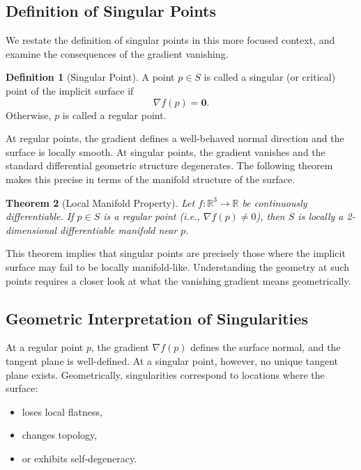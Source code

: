 \documentclass[12pt, a4paper, oneside]{book}
\theoremstyle{plain}
\newtheorem{theorem}{Theorem}[chapter]
\theoremstyle{definition}
\newtheorem{definition}[theorem]{Definition}
\theoremstyle{remark}
\theoremstyle{definition}
\begin{document}
\subsection{Definition of Singular Points}

We restate the definition of singular points in this more focused context, and examine the consequences of the gradient vanishing.

\begin{definition}[Singular Point]
A point $p \in S$ is called a singular (or critical) point of the implicit surface if
\[
\nabla f(p) = \mathbf{0}.
\]
Otherwise, $p$ is called a regular point.
\end{definition}

At regular points, the gradient defines a well-behaved normal direction and the surface
is locally smooth. At singular points, the gradient vanishes and the standard differential
geometric structure degenerates. The following theorem makes this precise in terms of the
manifold structure of the surface.

\begin{theorem}[Local Manifold Property]
Let $f:\mathbb{R}^3 \rightarrow \mathbb{R}$ be continuously differentiable. If $p \in S$
is a regular point (i.e., $\nabla f(p) \neq 0$), then $S$ is locally a 2-dimensional
differentiable manifold near $p$.
\end{theorem}

This theorem implies that singular points are precisely those where the implicit surface
may fail to be locally manifold-like. Understanding the geometry at such points requires
a closer look at what the vanishing gradient means geometrically.

\subsection{Geometric Interpretation of Singularities}

At a regular point $p$, the gradient $\nabla f(p)$ defines the surface normal, and the
tangent plane is well-defined. At a singular point, however, no unique tangent plane
exists. Geometrically, singularities correspond to locations where the surface:
\begin{itemize}
    \item loses local flatness,
    \item changes topology,
    \item or exhibits self-degeneracy.
\end{itemize}
\end{document}
